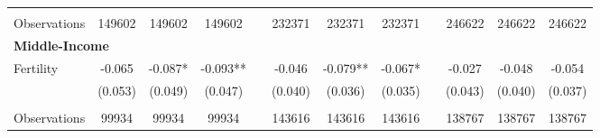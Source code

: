\begin{landscape}
\begin{table}[htpb!]
\begin{center}
\begin{tabular}{lcccp{2mm}cccp{2mm}ccc}
\begin{footnotesize}\end{footnotesize}&\begin{footnotesize}\end{footnotesize}&\begin{footnotesize}\end{footnotesize}&\begin{footnotesize}\end{footnotesize}&\begin{footnotesize}\end{footnotesize}&\begin{footnotesize}\end{footnotesize}&\begin{footnotesize}\end{footnotesize}&\begin{footnotesize}\end{footnotesize}&\begin{footnotesize}\end{footnotesize}&\begin{footnotesize}\end{footnotesize}\\Observations&149602&149602&149602&&232371&232371&232371&&246622&246622&246622\\
\multicolumn{12}{l}{\textbf{Middle-Income}}\\ 
Fertility&-0.065&-0.087*&-0.093**&&-0.046&-0.079**&-0.067*&&-0.027&-0.048&-0.054\\
&(0.053)&(0.049)&(0.047)&&(0.040)&(0.036)&(0.035)&&(0.043)&(0.040)&(0.037)\\
\begin{footnotesize}\end{footnotesize}&\begin{footnotesize}\end{footnotesize}&\begin{footnotesize}\end{footnotesize}&\begin{footnotesize}\end{footnotesize}&\begin{footnotesize}\end{footnotesize}&\begin{footnotesize}\end{footnotesize}&\begin{footnotesize}\end{footnotesize}&\begin{footnotesize}\end{footnotesize}&\begin{footnotesize}\end{footnotesize}&\begin{footnotesize}\end{footnotesize}\\Observations&99934&99934&99934&&143616&143616&143616&&138767&138767&138767\\

\end{tabular}
\end{center}
\end{table}
\end{landscape}

